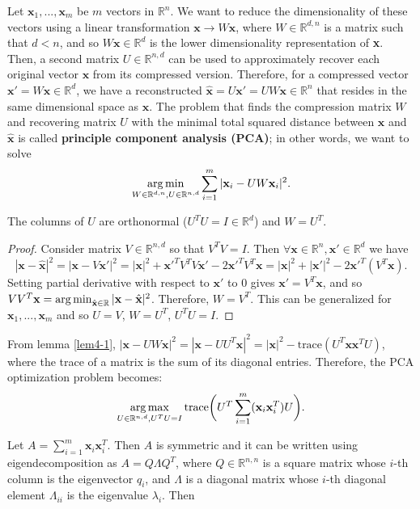 \documentclass[../main.tex]{subfiles}
\begin{document}
\setlength{\parindent}{0pt}
Let $\textbf{x}_1, ..., \textbf{x}_m$ be $m$ vectors in $\mathbb{R}^n$. We want to reduce the dimensionality of these vectors using a linear transformation $\textbf{x}\to W\textbf{x}$, where $W\in \mathbb{R}^{d, n}$ is a matrix such that $d<n$, and so $W\textbf{x}\in\mathbb{R}^d$ is the lower dimensionality representation of \textbf{x}. Then, a second matrix $U\in\mathbb{R}^{n, d}$ can be used to approximately recover each original vector $\textbf{x}$ from its compressed version. Therefore, for a compressed vector $\textbf{x}'=W\textbf{x}\in\mathbb{R}^d$, we have a reconstructed $\hat{\textbf{x}}=U\textbf{x}'=UW\textbf{x}\in\mathbb{R}^n$ that resides in the same dimensional space as $\textbf{x}$. The problem that finds the compression matrix $W$ and recovering matrix $U$ with the minimal total squared distance between $\textbf{x}$ and $\hat{\textbf{x}}$ is called \textbf{principle component analysis (PCA)}; in other words, we want to solve $$\operatorname*{arg\,min}_{W\in\mathbb{R}^{d, n}, U\in\mathbb{R}^{n, d}}\sum_{i=1}^{m}|\textbf{x}_i-UW\textbf{x}_i|^2.$$

\begin{lemma}\label{lem4-1}
The columns of $U$ are orthonormal ($U^TU=I\in\mathbb{R}^d$) and $W=U^T$.
\end{lemma}
\begin{proof}
Consider matrix $V\in\mathbb{R}^{n, d}$ so that $V^TV=I$. Then $\forall \textbf{x}\in \mathbb{R}^n,  \textbf{x}'\in\mathbb{R}^d$ we have $$|\textbf{x}-\hat{\textbf{x}}|^2=|\textbf{x}-V\textbf{x}'|^2=|\textbf{x}|^2+\textbf{x}'^TV^TV\textbf{x}'-2\textbf{x}'^TV^T\textbf{x}=|\textbf{x}|^2+|\textbf{x}'|^2-2\textbf{x}'^T(V^T\textbf{x}).$$ Setting partial derivative with respect to $\textbf{x}'$ to 0 gives $\textbf{x}'=V^T\textbf{x}$, and so $VV^T\textbf{x}=\operatorname*{arg\,min}_{\hat{\textbf{x}}\in\mathbb{R}}|\textbf{x}-\hat{\textbf{x}}|^2$. Therefore, $W=V^T$. This can be generalized for $\textbf{x}_1, ..., \textbf{x}_m$ and so $U=V$, $W=U^T$, $U^TU=I$.
\end{proof}

From lemma \ref{lem4-1}, $|\textbf{x}-UW\textbf{x}|^2=|\textbf{x}-UU^T\textbf{x}|^2=|\textbf{x}|^2-\text{trace}({U^T\textbf{xx}^TU})$, where the trace of a matrix is the sum of its diagonal entries. Therefore, the PCA optimization problem becomes: $$\operatorname*{arg\,max}_{U\in\mathbb{R}^{n, d}, U^TU=I}\text{trace}\bigg(U^T\sum_{i=1}^{m}(\textbf{x}_i\textbf{x}_i^T)U\bigg).$$

Let $A=\sum_{i=1}^{m}\textbf{x}_i\textbf{x}_i^T$. Then $A$ is symmetric and it can be written using eigendecomposition as $A=Q\Lambda Q^T$, where $Q\in\mathbb{R}^{n, n}$ is a square matrix whose $i$-th column is the eigenvector $q_i$, and $\Lambda$ is a diagonal matrix whose $i$-th diagonal element $\Lambda_{ii}$ is the eigenvalue $\lambda_i$. Then
\end{document}
